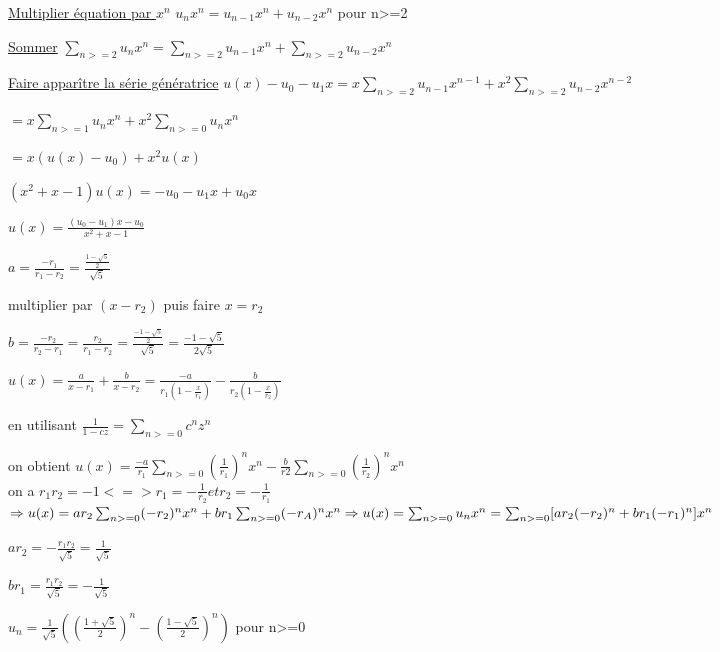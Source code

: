 \underline{Multiplier équation par $x^n$}
$u_nx^n = u_{n-1}x^n + u_{n-2}x^n$ pour n>=2

\underline{Sommer}
$\sum_{n>=2}u_nx^n = \sum_{n>=2}u_{n-1}x^n + \sum_{n>=2}u_{n-2}x^n$

\underline{Faire apparître la série génératrice}
$u(x) - u_0 - u_1x = x \sum_{n>=2}u_{n-1}x^{n-1} + x^2 \sum_{n>=2}u_{n-2}x^{n-2}$

$= x \sum_{n>=1}u_{n}x^{n} + x^2\sum_{n>=0}u_{n}x^{n}$

$= x (u(x) - u_0) + x^2u(x)$

$(x^2 + x -1)u(x) = -u_0 -u_1x + u_0x$

$u(x) = \frac{(u_0 - u_1)x-u_0}{x^2+x-1}$


$a = \frac{-r_1}{r_1-r_2} = \frac{\frac{1-\sqrt{5}}{2}}{\sqrt{5}}$

multiplier par $(x - r_2)$ puis faire $x=r_2$

$b = \frac{-r_2}{r_2-r_1} = \frac{r_2}{r_1-r_2} = \frac{\frac{-1-\sqrt{5}}{2}}{\sqrt{5}} = \frac{-1-\sqrt{5}}{2\sqrt{5}}$

$u(x) = \frac{a}{x-r_1} + \frac{b}{x-r_2} = \frac{-a}{r_1(1-\frac{x}{r_1})} - \frac{b}{r_2(1-\frac{x}{r_2})}$

en utilisant $\frac{1}{1-cz} = \sum_{n>=0}c^nz^n$

on obtient $u(x) = \frac{-a}{r_1} \sum_{n>=0}(\frac{1}{r_1})^n x^n - \frac{b}{r2} \sum_{n>=0}(\frac{1}{r_2})^n x^n$\\
on a $r_1r_2 = -1 <=> r_1 = -\frac{1}{r_2} et r_2 = -\frac{1}{r_1}$\\
$\Rightarrow u(x) = a r_2 \sum_{n>=0}(-r_2)^nx^n + br_1 \sum_{n>=0}(-r_A)^nx^n
\Rightarrow u(x) = \sum_{n>=0}u_nx^n = \sum_{n>=0}[ar_2(-r_2)^n + br_1(-r_1)^n] x^n$

$ar_2 = -\frac{r_1r_2}{\sqrt{5}} = \frac{1}{\sqrt{5}}$

$br_1 = \frac{r_1r_2}{\sqrt{5}} = -\frac{1}{\sqrt{5}}$

$u_n = \frac{1}{\sqrt{5}}((\frac{1+\sqrt{5}}{2})^n-(\frac{1-\sqrt{5}}{2})^n)$ pour n>=0






